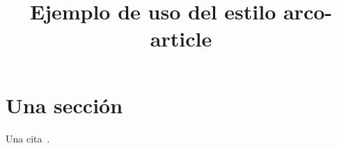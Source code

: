 \documentclass{arco-article}
\title{Ejemplo de uso del estilo arco-article}
\begin{document}
\maketitle

\section{Una sección}



Una cita~\cite{Cannon}.


\end{document}
